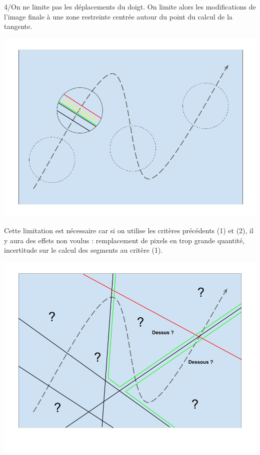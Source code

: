 \documentclass[a4paper,12pt]{report}
\begin{document}
4/On ne limite pas les déplacements du doigt.
On limite alors les modifications de l’image finale à une zone restreinte centrée autour du point du calcul de la tangente.
\begin{center}
 \includegraphics[scale=0.2]{./obturateur4.png}
\end{center}
Cette limitation est nécessaire car si on utilise les critères précédents (1) et (2),
il y aura des effets non voulus : remplacement de pixels en trop grande quantité, incertitude sur le calcul des segments au critère (1).
\begin{center}
 \includegraphics[scale=0.2]{./obturateur4exp.png}
\end{center}
\end{document}
